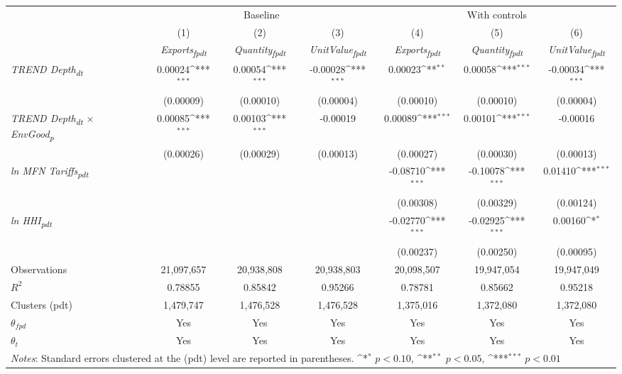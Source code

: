 {
\def\sym#1{\ifmmode^{#1}\else\(^{#1}\)\fi}
\begin{tabular}{l*{6}{c}}
\toprule
&\multicolumn{3}{c}{Baseline}&\multicolumn{3}{c}{With controls}\\\cmidrule(lr){2-4}\cmidrule(lr){5-7}
&(1)&(2)&(3)&(4)&(5)&(6)\\
&\textit{Exports\textsubscript{fpdt}}&\textit{Quantity\textsubscript{fpdt}}&\textit{UnitValue\textsubscript{fpdt}}&\textit{Exports\textsubscript{fpdt}}&\textit{Quantity\textsubscript{fpdt}}&\textit{UnitValue\textsubscript{fpdt}}\\
\midrule
\textit{TREND Depth\textsubscript{dt}} & 0.00024\sym{***} & 0.00054\sym{***} & -0.00028\sym{***} & 0.00023\sym{**} & 0.00058\sym{***} & -0.00034\sym{***}\\
 & (0.00009) & (0.00010) & (0.00004) & (0.00010) & (0.00010) & (0.00004)\\
\addlinespace
\textit{TREND Depth\textsubscript{dt} $\times$ EnvGood\textsubscript{p}} & 0.00085\sym{***} & 0.00103\sym{***} & -0.00019 & 0.00089\sym{***} & 0.00101\sym{***} & -0.00016\\
 & (0.00026) & (0.00029) & (0.00013) & (0.00027) & (0.00030) & (0.00013)\\
\addlinespace
\textit{ln MFN Tariffs\textsubscript{pdt}} &  &  &  & -0.08710\sym{***} & -0.10078\sym{***} & 0.01410\sym{***}\\
 &  &  &  & (0.00308) & (0.00329) & (0.00124)\\
\addlinespace
\textit{ln HHI\textsubscript{pdt}} &  &  &  & -0.02770\sym{***} & -0.02925\sym{***} & 0.00160\sym{*}\\
 &  &  &  & (0.00237) & (0.00250) & (0.00095)\\
\midrule
Observations & 21,097,657 & 20,938,808 & 20,938,803 & 20,098,507 & 19,947,054 & 19,947,049\\
$R^{2}$ & 0.78855 & 0.85842 & 0.95266 & 0.78781 & 0.85662 & 0.95218\\
Clusters (pdt) & 1,479,747 & 1,476,528 & 1,476,528 & 1,375,016 & 1,372,080 & 1,372,080\\
$\theta_{fpd}$ & Yes & Yes & Yes & Yes & Yes & Yes\\
$\theta_{t}$ & Yes & Yes & Yes & Yes & Yes & Yes\\
\bottomrule
\multicolumn{7}{l}{\footnotesize \textit{Notes}: Standard errors clustered at the (pdt) level are reported in parentheses. \sym{*} \(p<0.10\), \sym{**} \(p<0.05\), \sym{***} \(p<0.01\)}\\
\end{tabular}
}
